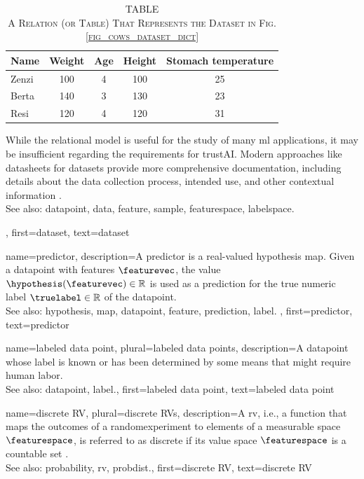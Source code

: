 {{\begin{table}[H]
			\caption*{
				\centering 
				\scshape TABLE \thetable \\[0.5ex]
				\scshape A Relation (or Table) That Represents the Dataset in Fig. \ref{fig_cows_dataset_dict} 
			}
			\label{tab:cowdata_dict} 
			\centering
			\begin{tabular}{lcccc}
				\hline
				\textbf{Name} & \textbf{Weight} & \textbf{Age} & \textbf{Height} & \textbf{Stomach temperature} \\
				\hline
				Zenzi & 100 & 4 & 100 & 25 \\
				Berta & 140 & 3 & 130 & 23 \\
				Resi  & 120 & 4 & 120 & 31 \\
				\hline
			\end{tabular}
		\end{table}
 		While the relational \gls{model} is useful for the study of many \gls{ml} applications, 
		it may be insufficient regarding the requirements for \gls{trustAI}. Modern 
 		approaches like datasheets for datasets provide more comprehensive 
 		documentation, including details about the \gls{data} collection process, intended 
 		use, and other contextual information \cite{DatasheetData2021}.
 		\\
		See also: \gls{datapoint}, \gls{data}, \gls{feature}, \gls{sample}, \gls{featurespace}, \gls{labelspace}.},
	first={dataset},
	text={dataset}  
}

{name={predictor},
	description={A predictor is a real-valued \gls{hypothesis} \gls{map}. 
		Given a \gls{datapoint} with \glspl{feature} $\featurevec$, the value 
		$\hypothesis(\featurevec) \in \mathbb{R}$ is used as a \gls{prediction} for the true 
		numeric \gls{label} $\truelabel \in \mathbb{R}$ of the \gls{datapoint}.
				\\
		See also: \gls{hypothesis}, \gls{map}, \gls{datapoint}, \gls{feature}, \gls{prediction}, \gls{label}. },
	first={predictor},
	text={predictor}  
}

{name={labeled data point}, plural={labeled data points},
 	description={A \gls{datapoint} whose \gls{label} is known or has been determined 
 		by some means that might require human labor.
			\\
		See also: \gls{datapoint}, \gls{label}.},
 	first={labeled data point},
 	text={labeled data point}  
}

{name={discrete RV}, 
  plural={discrete RVs},
 	description={A \gls{rv}, i.e., a \gls{function} that maps the 
		outcomes of a \gls{randomexperiment} to elements of a \gls{measurable} space $\featurespace$, 
		is referred to as discrete if its value space $\featurespace$ is a countable set \cite{BillingsleyProbMeasure}. 
			\\
		See also: \gls{probability}, \gls{rv}, \gls{probdist}.},
 	first={discrete RV},
 	text={discrete RV}  
}



